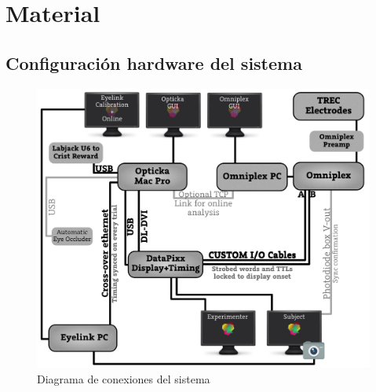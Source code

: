 \documentclass[conference]{IEEEtran}
\begin{document}
\section{Material}

\subsection{Configuración hardware del sistema}

\begin{figure}[htbp]
\centerline{\includegraphics[width=\linewidth]{figures/system_diagram.png}}
\caption{Diagrama de conexiones del sistema}
\label{figSysDiagram}
\end{figure}
\end{document}
